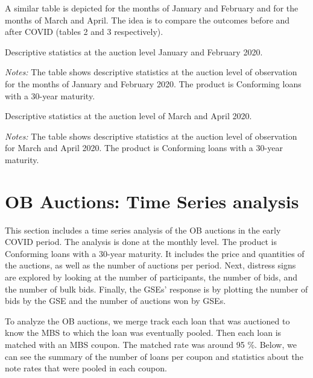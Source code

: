 \documentclass[11pt,a4paper]{article}
\begin{document}
A similar table is depicted for the months of January and February and for the months of March and April. The idea is to compare the outcomes before and after COVID (tables 2 and 3 respectively).

\begin{table}[h]
  \centering
  
  \caption{Descriptive statistics at the auction level January and February 2020. }
  \begin{minipage}{\textwidth}
      \footnotesize{\textit{Notes:} The table shows descriptive statistics at the auction level of observation for the months of January and  February 2020. The product is Conforming loans with a 30-year maturity. } 
      \end{minipage}
\end{table}

\begin{table}[h]
  \centering
  
  \caption{Descriptive statistics at the auction level of March and April 2020. }
  \begin{minipage}{\textwidth}
      \footnotesize{\textit{Notes:} The table shows descriptive statistics at the auction level of observation for March and April 2020. The product is Conforming loans with a 30-year maturity. } 
      \end{minipage}
\end{table}

\pagebreak
\section{OB Auctions: Time Series analysis}

This section includes a time series analysis of the OB auctions in the early COVID period. The analysis is done at the monthly level. The product is Conforming loans with a 30-year maturity. It includes the price and quantities of the auctions, as well as the number of auctions per period. Next, distress signs are explored by looking at the number of participants, the number of bids, and the number of bulk bids. Finally, the GSEs' response is by plotting the number of bids by the GSE and the number of auctions won by GSEs.

To analyze the OB auctions, we merge track each loan that was auctioned to know the MBS to which the loan was eventually pooled. Then each loan is matched with an MBS coupon. The matched rate was around 95 \%. Below, we can see the summary of the number of loans per coupon and statistics about the note rates that were pooled in each coupon. 
\end{document}

